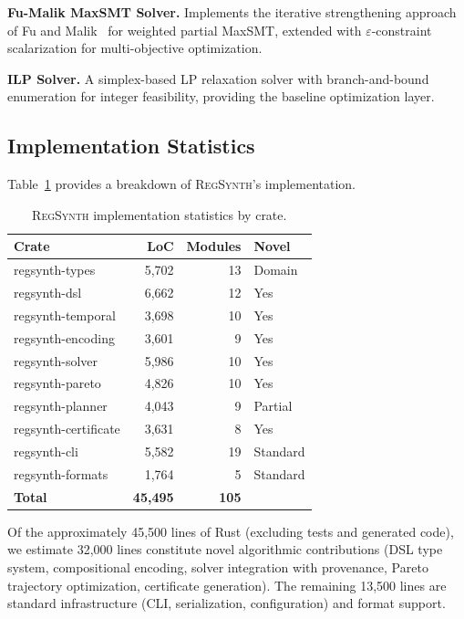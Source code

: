\documentclass[11pt,twocolumn]{article}
\newcommand{\regsynth}{\textsc{RegSynth}}
\begin{document}
\textbf{Fu-Malik MaxSMT Solver.} Implements the iterative strengthening
approach of Fu and Malik~\cite{fumalik2006} for weighted partial MaxSMT, extended
with $\varepsilon$-constraint scalarization for multi-objective optimization.

\textbf{ILP Solver.} A simplex-based LP relaxation solver with branch-and-bound
enumeration for integer feasibility, providing the baseline optimization layer.

\subsection{Implementation Statistics}

Table~\ref{tab:loc} provides a breakdown of \regsynth{}'s implementation.

\begin{table}[t]
\centering
\caption{\regsynth{} implementation statistics by crate.}
\label{tab:loc}
\small
\begin{tabular}{lrrl}
\toprule
\textbf{Crate} & \textbf{LoC} & \textbf{Modules} & \textbf{Novel} \\
\midrule
regsynth-types & 5{,}702 & 13 & Domain \\
regsynth-dsl & 6{,}662 & 12 & Yes \\
regsynth-temporal & 3{,}698 & 10 & Yes \\
regsynth-encoding & 3{,}601 & 9 & Yes \\
regsynth-solver & 5{,}986 & 10 & Yes \\
regsynth-pareto & 4{,}826 & 10 & Yes \\
regsynth-planner & 4{,}043 & 9 & Partial \\
regsynth-certificate & 3{,}631 & 8 & Yes \\
regsynth-cli & 5{,}582 & 19 & Standard \\
regsynth-formats & 1{,}764 & 5 & Standard \\
\midrule
\textbf{Total} & \textbf{45{,}495} & \textbf{105} & \\
\bottomrule
\end{tabular}
\end{table}

Of the approximately 45{,}500 lines of Rust (excluding tests and
generated code), we estimate 32{,}000 lines constitute novel algorithmic
contributions (DSL type system, compositional encoding, solver integration with
provenance, Pareto trajectory optimization, certificate generation). The
remaining 13{,}500 lines are standard infrastructure (CLI, serialization,
configuration) and format support.
\end{document}

